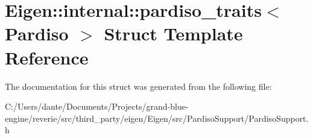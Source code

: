 \hypertarget{struct_eigen_1_1internal_1_1pardiso__traits}{}\section{Eigen\+::internal\+::pardiso\+\_\+traits$<$ Pardiso $>$ Struct Template Reference}
\label{struct_eigen_1_1internal_1_1pardiso__traits}


The documentation for this struct was generated from the following file\+:\begin{DoxyCompactItemize}
\item 
C\+:/\+Users/dante/\+Documents/\+Projects/grand-\/blue-\/engine/reverie/src/third\+\_\+party/eigen/\+Eigen/src/\+Pardiso\+Support/Pardiso\+Support.\+h\end{DoxyCompactItemize}
